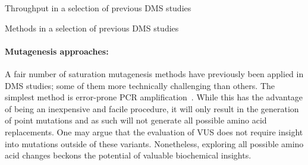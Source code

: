 \begin{landscape}
\begin{table}
	\centering
	\caption{Throughput in a selection of previous DMS studies}
	\label{table:DMSstudiesTP}
	
\end{table}

\begin{table}
	\centering
	\caption{Methods in a selection of previous DMS studies}
	\label{table:DMSstudiesMethods}
	
\end{table}
\end{landscape}






\paragraph{Mutagenesis approaches:} A fair number of saturation mutagenesis methods have previously been applied in DMS studies; some of them more technically challenging than others. The simplest method is error-prone PCR amplification~\cite{cadwell_mutagenic_1994,mohan_pcr_2011}. While this has the advantage of being an inexpensive and facile procedure, it will only result in the generation of point mutations and as such will not generate all possible amino acid replacements. One may argue that the evaluation of VUS does not require insight into mutations outside of these variants. Nonetheless, exploring all possible amino acid changes beckons the potential of valuable biochemical insights. 

